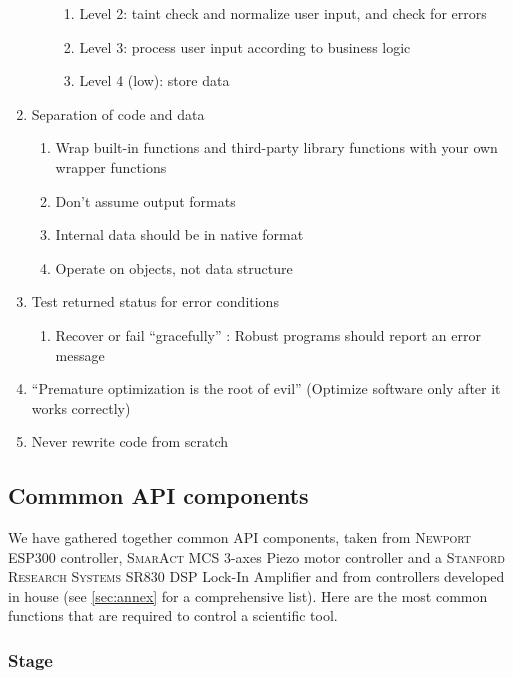 \documentclass[10pt,letter,twoside]{report}
\begin{document}
\begin{singlespacing}
\begin{enumerate}
\begin{enumerate}
\begin{enumerate}
					\item Level 2: taint check and normalize user input, and check for errors
					\item Level 3: process user input according to business logic
					\item Level 4 (low): store data
				\end{enumerate}
			\end{enumerate}
			\item Separation of code and data
			\begin{enumerate}
				\item Wrap built-in functions and third-party library functions with your own wrapper functions
				\item Don’t assume output formats
				\item Internal data should be in native format
				\item Operate on objects, not data structure
			\end{enumerate}
						
			\item Test returned status for error conditions
			\begin{enumerate}
				\item Recover or fail “gracefully” : Robust programs should report an error message
			\end{enumerate}
			\item “Premature optimization is the root of evil” (Optimize software only after it works correctly)
			\item Never rewrite code from scratch
		\end{enumerate}		
		\end{singlespacing}

		\subsection{Commmon API components}
		We have gathered together common API components, taken from \textsc{Newport} ESP300 controller, \textsc{SmarAct} MCS 
3-axes Piezo motor controller and a \textsc{Stanford Research Systems} SR830 DSP Lock-In Amplifier and from controllers developed in house (see \ref{sec:annex} for a comprehensive list).
Here are the most common functions that are required to control a scientific tool.
		\subsubsection{Stage}
\end{document}
